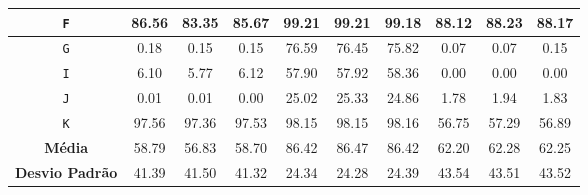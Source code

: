 \begin{table}[ht]
\begin{tabular}{|c|c|c|c|c|c|c|c|c|c|}
            \texttt{F}             & 86.56                                 & 83.35                                   & 85.67                                  & 99.21          & 99.21          & 99.18          & 88.12          & 88.23          & 88.17          \\ \hline
            \texttt{G}             & 0.18                                  & 0.15                                    & 0.15                                   & 76.59          & 76.45          & 75.82          & 0.07           & 0.07           & 0.15           \\ \hline
            \texttt{I}             & 6.10                                  & 5.77                                    & 6.12                                   & 57.90          & 57.92          & 58.36          & 0.00           & 0.00           & 0.00           \\ \hline
            \texttt{J}             & 0.01                                  & 0.01                                    & 0.00                                   & 25.02          & 25.33          & 24.86          & 1.78           & 1.94           & 1.83           \\ \hline
            \texttt{K}             & 97.56                                 & 97.36                                   & 97.53                                  & 98.15          & 98.15          & 98.16          & 56.75          & 57.29          & 56.89          \\ \hline
            \textbf{Média}         & 58.79                                 & 56.83                                   & 58.70                                  & 86.42          & 86.47          & 86.42          & 62.20          & 62.28          & 62.25          \\ \hline
            \textbf{Desvio Padrão} & 41.39                                 & 41.50                                   & 41.32                                  & 24.34          & 24.28          & 24.39          & 43.54          & 43.51          & 43.52          \\ \hline
      \end{tabular}
      \label{table:pdr}
\end{table}

